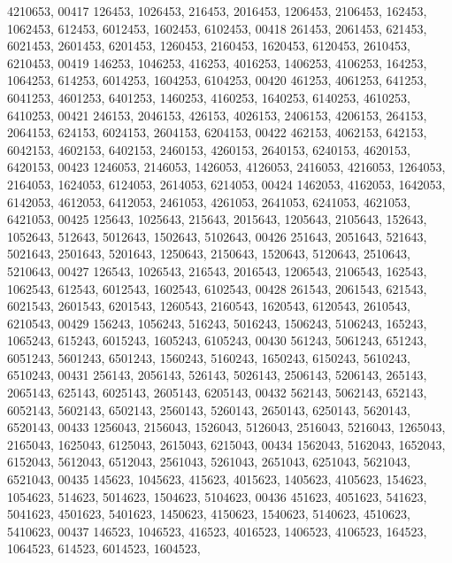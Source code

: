 \begin{DoxyCode}
      4210653,
00417        126453, 1026453,  216453, 2016453, 1206453, 2106453,  162453, 1062453,  612453, 6012453, 1602453, 
      6102453,
00418        261453, 2061453,  621453, 6021453, 2601453, 6201453, 1260453, 2160453, 1620453, 6120453, 2610453, 
      6210453,
00419        146253, 1046253,  416253, 4016253, 1406253, 4106253,  164253, 1064253,  614253, 6014253, 1604253, 
      6104253,
00420        461253, 4061253,  641253, 6041253, 4601253, 6401253, 1460253, 4160253, 1640253, 6140253, 4610253, 
      6410253,
00421        246153, 2046153,  426153, 4026153, 2406153, 4206153,  264153, 2064153,  624153, 6024153, 2604153, 
      6204153,
00422        462153, 4062153,  642153, 6042153, 4602153, 6402153, 2460153, 4260153, 2640153, 6240153, 4620153, 
      6420153,
00423       1246053, 2146053, 1426053, 4126053, 2416053, 4216053, 1264053, 2164053, 1624053, 6124053, 2614053, 
      6214053,
00424       1462053, 4162053, 1642053, 6142053, 4612053, 6412053, 2461053, 4261053, 2641053, 6241053, 4621053, 
      6421053,
00425        125643, 1025643,  215643, 2015643, 1205643, 2105643,  152643, 1052643,  512643, 5012643, 1502643, 
      5102643,
00426        251643, 2051643,  521643, 5021643, 2501643, 5201643, 1250643, 2150643, 1520643, 5120643, 2510643, 
      5210643,
00427        126543, 1026543,  216543, 2016543, 1206543, 2106543,  162543, 1062543,  612543, 6012543, 1602543, 
      6102543,
00428        261543, 2061543,  621543, 6021543, 2601543, 6201543, 1260543, 2160543, 1620543, 6120543, 2610543, 
      6210543,
00429        156243, 1056243,  516243, 5016243, 1506243, 5106243,  165243, 1065243,  615243, 6015243, 1605243, 
      6105243,
00430        561243, 5061243,  651243, 6051243, 5601243, 6501243, 1560243, 5160243, 1650243, 6150243, 5610243, 
      6510243,
00431        256143, 2056143,  526143, 5026143, 2506143, 5206143,  265143, 2065143,  625143, 6025143, 2605143, 
      6205143,
00432        562143, 5062143,  652143, 6052143, 5602143, 6502143, 2560143, 5260143, 2650143, 6250143, 5620143, 
      6520143,
00433       1256043, 2156043, 1526043, 5126043, 2516043, 5216043, 1265043, 2165043, 1625043, 6125043, 2615043, 
      6215043,
00434       1562043, 5162043, 1652043, 6152043, 5612043, 6512043, 2561043, 5261043, 2651043, 6251043, 5621043, 
      6521043,
00435        145623, 1045623,  415623, 4015623, 1405623, 4105623,  154623, 1054623,  514623, 5014623, 1504623, 
      5104623,
00436        451623, 4051623,  541623, 5041623, 4501623, 5401623, 1450623, 4150623, 1540623, 5140623, 4510623, 
      5410623,
00437        146523, 1046523,  416523, 4016523, 1406523, 4106523,  164523, 1064523,  614523, 6014523, 1604523, 

\end{DoxyCode}
